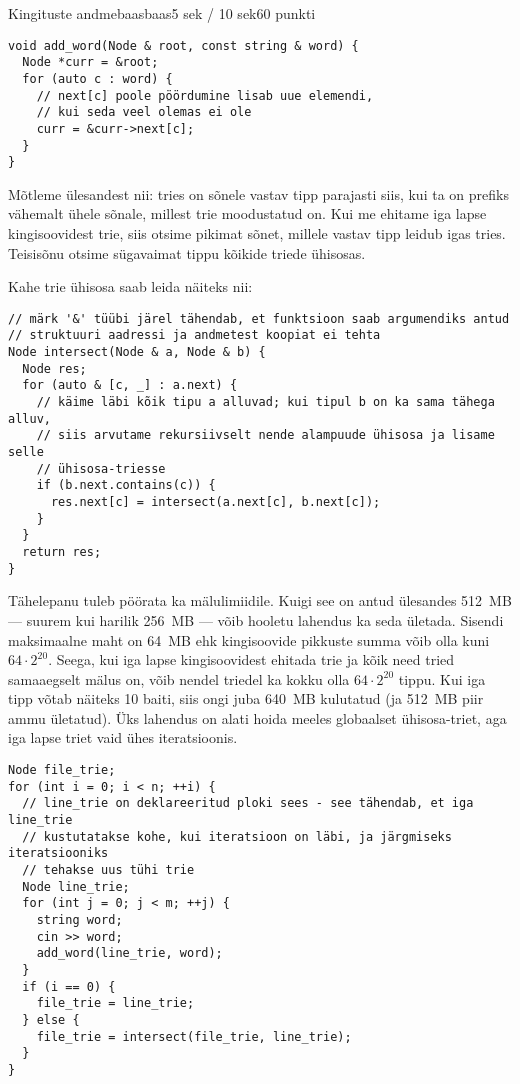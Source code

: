 \begin{yl}{5}{Kingituste andmebaas}{baas}{5 sek / 10 sek}{60 punkti}
\begin{lstlisting}
void add_word(Node & root, const string & word) {
  Node *curr = &root;
  for (auto c : word) {
    // next[c] poole pöördumine lisab uue elemendi,
    // kui seda veel olemas ei ole
    curr = &curr->next[c];
  }
}
\end{lstlisting}

  Mõtleme ülesandest nii: tries on sõnele vastav tipp parajasti siis, kui ta on prefiks vähemalt ühele
  sõnale, millest trie moodustatud on. Kui me ehitame iga lapse kingisoovidest trie, siis
  otsime pikimat sõnet, millele vastav tipp leidub igas tries. Teisisõnu otsime sügavaimat tippu
  kõikide triede ühisosas.

  Kahe trie ühisosa saab leida näiteks nii:
  \begin{lstlisting}
// märk '&' tüübi järel tähendab, et funktsioon saab argumendiks antud
// struktuuri aadressi ja andmetest koopiat ei tehta
Node intersect(Node & a, Node & b) {
  Node res;
  for (auto & [c, _] : a.next) {
    // käime läbi kõik tipu a alluvad; kui tipul b on ka sama tähega alluv,
    // siis arvutame rekursiivselt nende alampuude ühisosa ja lisame selle
    // ühisosa-triesse
    if (b.next.contains(c)) {
      res.next[c] = intersect(a.next[c], b.next[c]);
    }
  }
  return res;
}
  \end{lstlisting}

  Tähelepanu tuleb pöörata ka mälulimiidile. Kuigi see on antud ülesandes 512~MB --- suurem kui harilik
  256~MB --- võib hooletu lahendus ka seda ületada.
  Sisendi maksimaalne maht on 64~MB ehk kingisoovide pikkuste summa võib olla kuni $64 \cdot 2^{20}$.
  Seega, kui iga lapse kingisoovidest ehitada trie ja kõik need tried samaaegselt mälus on,
  võib nendel triedel ka kokku olla $64 \cdot 2^{20}$ tippu. Kui iga tipp võtab näiteks 10 baiti,
  siis ongi juba 640~MB kulutatud (ja 512~MB piir ammu ületatud).
  Üks lahendus on alati hoida meeles globaalset ühisosa-triet, aga iga lapse triet vaid ühes iteratsioonis.
  \begin{lstlisting}
Node file_trie;
for (int i = 0; i < n; ++i) {
  // line_trie on deklareeritud ploki sees - see tähendab, et iga line_trie
  // kustutatakse kohe, kui iteratsioon on läbi, ja järgmiseks iteratsiooniks
  // tehakse uus tühi trie
  Node line_trie;
  for (int j = 0; j < m; ++j) {
    string word;
    cin >> word;
    add_word(line_trie, word);
  }
  if (i == 0) {
    file_trie = line_trie;
  } else {
    file_trie = intersect(file_trie, line_trie);
  }
}
\end{lstlisting}


\end{yl}
